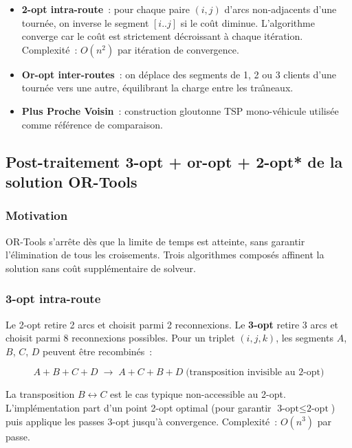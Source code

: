 \documentclass[a4paper, 12pt, twoside]{article}
\begin{document}
\begin{itemize}
  \item \textbf{2-opt intra-route}~: pour chaque paire $(i, j)$ d'arcs non-adjacents d'une tourn\'{e}e, on inverse le segment $[i..j]$ si le co\^{u}t diminue. L'algorithme converge car le co\^{u}t est strictement d\'{e}croissant \`{a} chaque it\'{e}ration. Complexit\'{e}~: $O(n^2)$ par it\'{e}ration de convergence.
  \item \textbf{Or-opt inter-routes}~: on d\'{e}place des segments de 1, 2 ou 3 clients d'une tourn\'{e}e vers une autre, \'{e}quilibrant la charge entre les tra\^{\i}neaux.
  \item \textbf{Plus Proche Voisin}~: construction gloutonne TSP mono-v\'{e}hicule utilis\'{e}e comme r\'{e}f\'{e}rence de comparaison.
\end{itemize}

\subsection{Post-traitement 3-opt + or-opt + 2-opt* de la solution OR-Tools}

\subsubsection{Motivation}

OR-Tools s'arr\^{e}te d\`{e}s que la limite de temps est atteinte, sans garantir l'\'{e}limination de tous les croisements. Trois algorithmes compos\'{e}s affinent la solution sans co\^{u}t suppl\'{e}mentaire de solveur.

\subsubsection{3-opt intra-route}

Le 2-opt retire 2 arcs et choisit parmi 2 reconnexions. Le \textbf{3-opt} retire 3 arcs et choisit parmi 8 reconnexions possibles. Pour un triplet $(i, j, k)$, les segments $A$, $B$, $C$, $D$ peuvent \^{e}tre recombinés~:

\[
A + B + C + D \;\rightarrow\; A + C + B + D \;\text{(transposition invisible au 2-opt)}
\]

La transposition $B \leftrightarrow C$ est le cas typique non-accessible au 2-opt. L'impl\'{e}mentation part d'un point 2-opt optimal (pour garantir $\text{3-opt} \leq \text{2-opt}$) puis applique les passes 3-opt jusqu'\`{a} convergence. Complexit\'{e}~: $O(n^3)$ par passe.
\end{document}

